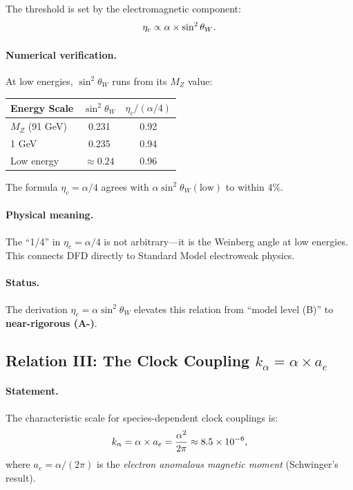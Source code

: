 The threshold is set by the electromagnetic component:
\begin{equation}
\eta_c \propto \alpha \times \sin^2\theta_W.
\end{equation}

\paragraph{Numerical verification.}
At low energies, $\sin^2\theta_W$ runs from its $M_Z$ value:
\begin{center}
\renewcommand{\arraystretch}{1.2}
\begin{tabular}{lcc}
\toprule
Energy Scale & $\sin^2\theta_W$ & $\eta_c/(\alpha/4)$ \\
\midrule
$M_Z$ (91 GeV) & 0.231 & 0.92 \\
1 GeV & 0.235 & 0.94 \\
Low energy & $\approx 0.24$ & 0.96 \\
\bottomrule
\end{tabular}
\end{center}

The formula $\eta_c = \alpha/4$ agrees with $\alpha \sin^2\theta_W(\text{low})$ to within 4\%.

\paragraph{Physical meaning.}
The ``1/4'' in $\eta_c = \alpha/4$ is not arbitrary---it is the Weinberg angle at low energies. This connects DFD directly to Standard Model electroweak physics.

\paragraph{Status.}
The derivation $\eta_c = \alpha \sin^2\theta_W$ elevates this relation from ``model level (B)'' to \textbf{near-rigorous (A-)}.

\subsection{Relation III: The Clock Coupling $k_\alpha = \alpha \times a_e$}\label{sec:alpha-kalpha}

\paragraph{Statement.}
The characteristic scale for species-dependent clock couplings is:
\begin{equation}\label{eq:kalpha-relation}
k_\alpha = \alpha \times a_e = \frac{\alpha^2}{2\pi} \approx 8.5 \times 10^{-6},
\end{equation}
where $a_e = \alpha/(2\pi)$ is the \textit{electron anomalous magnetic moment} (Schwinger's result).


